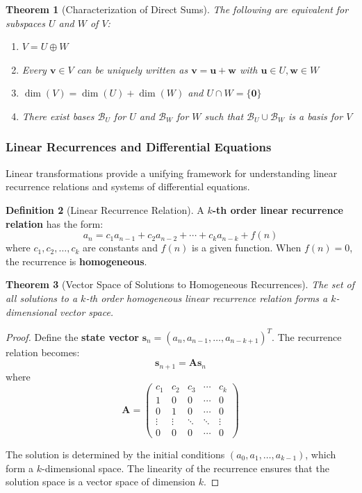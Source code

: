 \documentclass[12pt]{article}
\numberwithin{equation}{section}
\newcommand{\vect}[1]{\boldsymbol{#1}}   %
\newcommand{\mat}[1]{\mathbf{#1}}        %
\theoremstyle{plain}
\newtheorem{theorem}{Theorem}[section]
\theoremstyle{definition}
\newtheorem{definition}[theorem]{Definition}
\theoremstyle{remark}
\begin{document}
\begin{theorem}[Characterization of Direct Sums]
The following are equivalent for subspaces $U$ and $W$ of $V$:
\begin{enumerate}
\item $V = U \oplus W$
\item Every $\vect{v} \in V$ can be uniquely written as $\vect{v} = \vect{u} + \vect{w}$ with $\vect{u} \in U, \vect{w} \in W$
\item $\dim(V) = \dim(U) + \dim(W)$ and $U \cap W = \{\vect{0}\}$
\item There exist bases $\mathcal{B}_U$ for $U$ and $\mathcal{B}_W$ for $W$ such that $\mathcal{B}_U \cup \mathcal{B}_W$ is a basis for $V$
\end{enumerate}
\end{theorem}

\subsubsection{Linear Recurrences and Differential Equations}

Linear transformations provide a unifying framework for understanding linear recurrence relations and systems of differential equations.

\begin{definition}[Linear Recurrence Relation]
A \textbf{$k$-th order linear recurrence relation} has the form:
$$a_n = c_1a_{n-1} + c_2a_{n-2} + \cdots + c_ka_{n-k} + f(n)$$
where $c_1, c_2, \ldots, c_k$ are constants and $f(n)$ is a given function. When $f(n) = 0$, the recurrence is \textbf{homogeneous}.
\end{definition}

\begin{theorem}[Vector Space of Solutions to Homogeneous Recurrences]
The set of all solutions to a $k$-th order homogeneous linear recurrence relation forms a $k$-dimensional vector space.
\end{theorem}

\begin{proof}
Define the \textbf{state vector} $\vect{s}_n = (a_n, a_{n-1}, \ldots, a_{n-k+1})^T$. The recurrence relation becomes:
$$\vect{s}_{n+1} = \mat{A}\vect{s}_n$$
where
$$\mat{A} = \begin{pmatrix}
c_1 & c_2 & c_3 & \cdots & c_k \\
1 & 0 & 0 & \cdots & 0 \\
0 & 1 & 0 & \cdots & 0 \\
\vdots & \vdots & \ddots & \ddots & \vdots \\
0 & 0 & 0 & \cdots & 0
\end{pmatrix}$$

The solution is determined by the initial conditions $(a_0, a_1, \ldots, a_{k-1})$, which form a $k$-dimensional space. The linearity of the recurrence ensures that the solution space is a vector space of dimension $k$.
\end{proof}
\end{document}
